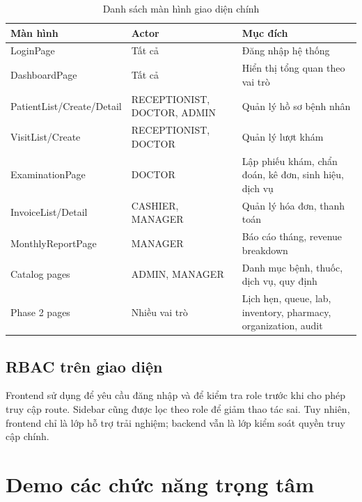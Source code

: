 \begin{longtable}{|p{4cm}|p{3.2cm}|p{7cm}|}
\caption{Danh sách màn hình giao diện chính}\\
\hline
\textbf{Màn hình} & \textbf{Actor} & \textbf{Mục đích} \\
\hline
LoginPage & Tất cả & Đăng nhập hệ thống \\
\hline
DashboardPage & Tất cả & Hiển thị tổng quan theo vai trò \\
\hline
PatientList/Create/Detail & RECEPTIONIST, DOCTOR, ADMIN & Quản lý hồ sơ bệnh nhân \\
\hline
VisitList/Create & RECEPTIONIST, DOCTOR & Quản lý lượt khám \\
\hline
ExaminationPage & DOCTOR & Lập phiếu khám, chẩn đoán, kê đơn, sinh hiệu, dịch vụ \\
\hline
InvoiceList/Detail & CASHIER, MANAGER & Quản lý hóa đơn, thanh toán \\
\hline
MonthlyReportPage & MANAGER & Báo cáo tháng, revenue breakdown \\
\hline
Catalog pages & ADMIN, MANAGER & Danh mục bệnh, thuốc, dịch vụ, quy định \\
\hline
Phase 2 pages & Nhiều vai trò & Lịch hẹn, queue, lab, inventory, pharmacy, organization, audit \\
\hline
\end{longtable}

\subsection{RBAC trên giao diện}

Frontend sử dụng  để yêu cầu đăng nhập và  để kiểm tra role trước khi cho phép truy cập route. Sidebar cũng được lọc theo role để giảm thao tác sai. Tuy nhiên, frontend chỉ là lớp hỗ trợ trải nghiệm; backend vẫn là lớp kiểm soát quyền truy cập chính.

\section{Demo các chức năng trọng tâm}

